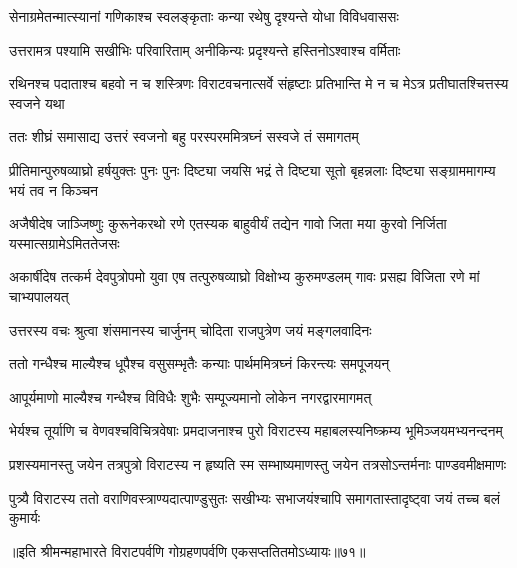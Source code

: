


\twolineshloka
{सेनाग्रमेतन्मात्स्यानां गणिकाश्च स्वलङ्कृताः}
{कन्या रथेषु दृश्यन्ते योधा विविधवाससः}


\twolineshloka
{उत्तरामत्र पश्यामि सखीभिः परिवारिताम्}
{अनीकिन्यः प्रदृश्यन्ते हस्तिनोऽश्वाश्च वर्मिताः}


\threelineshloka
{रथिनश्च पदाताश्च बहवो न च शस्त्रिणः}
{विराटवचनात्सर्वे संहृष्टाः प्रतिभान्ति मे}
{न च मेऽत्र प्रतीघातश्चित्तस्य स्वजने यथा}



\twolineshloka
{ततः शीघ्रं समासाद्य उत्तरं स्वजनो बहु}
{परस्परममित्रघ्नं सस्वजे तं समागतम्}




\threelineshloka
{प्रीतिमान्पुरुषव्याघ्रो हर्षयुक्तः पुनः पुनः}
{दिष्ट्या जयसि भद्रं ते दिष्ट्या सूतो बृहन्नलाः}
{दिष्ट्या सङ्ग्राममागम्य भयं तव न किञ्चन}




\threelineshloka
{अजैषीदेष जाञ्जिष्णुः कुरूनेकरथो रणे}
{एतस्यक बाहुवीर्यं तद्येन गावो जिता मया}
{कुरवो निर्जिता यस्मात्सग्रामेऽमिततेजसः}


\threelineshloka
{अकार्षीदेष तत्कर्म देवपुत्रोपमो युवा}
{एष तत्पुरुषव्याघ्रो विक्षोभ्य कुरुमण्डलम्}
{गावः प्रसह्य विजिता रणे मां चाभ्यपालयत्}



\twolineshloka
{उत्तरस्य वचः श्रुत्वा शंसमानस्य चार्जुनम्}
{चोदिता राजपुत्रेण जयं मङ्गलवादिनः}


\twolineshloka
{ततो गन्धैश्च माल्यैश्च धूपैश्च वसुसम्भृतैः}
{कन्याः पार्थममित्रघ्नं किरन्त्यः समपूजयन्}


\twolineshloka
{आपूर्यमाणो माल्यैश्च गन्धैश्च विविधैः शुभैः}
{सम्पूज्यमानो लोकेन नगरद्वारमागमत्}


\twolineshloka
{भेर्यश्च तूर्याणि च वेणवश्चविचित्रवेषाः प्रमदाजनाश्च}
{पुरो विराटस्य महाबलस्यनिष्क्रम्य भूमिञ्जयमभ्यनन्दनम्}


\twolineshloka
{प्रशस्यमानस्तु जयेन तत्रपुत्रो विराटस्य न हृष्यति स्म}
{सम्भाष्यमाणस्तु जयेन तत्रसोऽन्तर्मनाः पाण्डवमीक्षमाणः}


\twolineshloka
{पुत्र्यै विराटस्य ततो वराणिवस्त्राण्यदात्पाण्डुसुतः सखीभ्यः}
{सभाजयंश्चापि समागतास्तादृष्ट्वा जयं तच्च बलं कुमार्यः}

॥इति श्रीमन्महाभारते विराटपर्वणि गोग्रहणपर्वणि एकसप्ततितमोऽध्यायः॥७१॥

